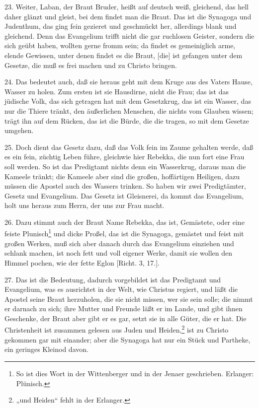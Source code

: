23. Weiter, Laban, der Braut Bruder, heißt auf deutsch weiß, gleichend, das hell daher glänzt und gleist, bei dem findet man die Braut. Das ist die Synagoga und Judenthum, das ging fein gezieret und geschmückt her, allerdings blank und gleichend. Denn das Evangelium trifft nicht die gar ruchlosen Geister, sondern die sich geübt haben, wollten gerne fromm sein; da findet es gemeiniglich arme, elende Gewissen, unter denen findet es die Braut, [die] ist gefangen unter dem Gesetze, die muß es frei machen und zu Christo bringen.

24. Das bedeutet auch, daß sie heraus geht mit dem Kruge aus des Vaters Hause, Wasser zu holen. Zum ersten ist sie Hausdirne, nicht die Frau; das ist das jüdische Volk, das sich getragen hat mit dem Gesetzkrug, das ist ein Wasser, das nur die Thiere tränkt, den äußerlichen Menschen, die nichts vom Glauben wissen; trägt ihn auf dem Rücken, das ist die Bürde, die die tragen, so mit dem Gesetze umgehen.

25. Doch dient das Gesetz dazu, daß das Volk fein im Zaume gehalten werde, daß es ein fein, züchtig Leben führe, gleichwie hier Rebekka, die nun fort eine Frau soll werden. So ist das Predigtamt nichts denn ein Wasserkrug, daraus man die Kameele tränkt; die Kameele aber sind die großen, hoffärtigen Heiligen, dazu müssen die Apostel auch des Wassers trinken. So haben wir zwei Predigtämter, Gesetz und Evangelium. Das Gesetz ist Gleisnerei, da kommt das Evangelium, holt uns heraus zum Herrn, der uns zur Frau macht.

26. Dazu stimmt auch der Braut Name Rebekka, das ist, Gemästete, oder eine feiste Plunisch\footnote{So ist dies Wort in der Wittenberger und in der Jenaer geschrieben. Erlanger: Plünisch.} und dicke Proßel, das ist die Synagoga, gemästet und feist mit großen Werken, muß sich aber danach durch das Evangelium einziehen und schlank machen, ist noch fett und voll eigener Werke, damit sie wollen den Himmel pochen, wie der fette Eglon [Richt. 3, 17.].

27. Das ist die Bedeutung, dadurch vorgebildet ist das Predigtamt und Evangelium, was es ausrichtet in der Welt, wie Christus regiert, und läßt die Apostel seine Braut herzuholen, die sie nicht missen, wer sie sein solle; die nimmt er darnach zu sich; ihre Mutter und Freunde läßt er im Lande, und gibt ihnen Geschenke, der Braut aber gibt er es gar, setzt sie in alle Güter, die er hat. Die Christenheit ist zusammen gelesen aus Juden und Heiden,\footnote{„und Heiden“ fehlt in der Erlanger.} ist zu Christo gekommen gar mit einander; aber die Synagoga hat nur ein Stück und Partheke, ein geringes Kleinod davon.

